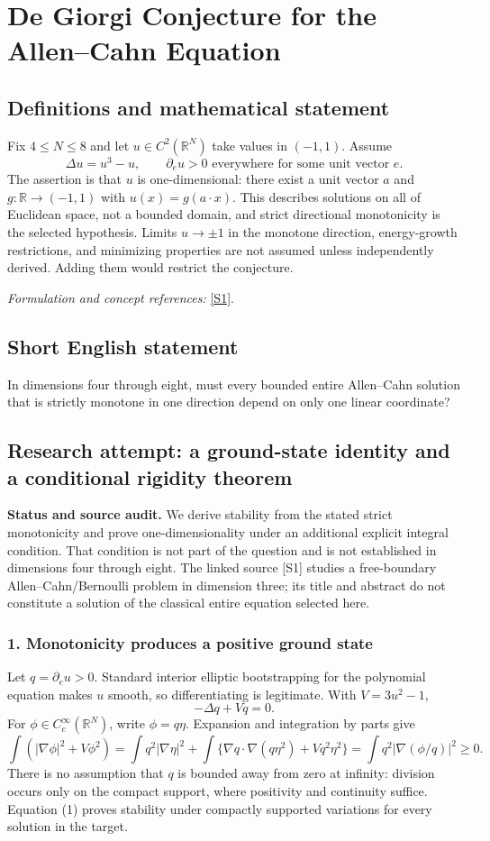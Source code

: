 \documentclass[11pt]{article}
\begin{document}
\section*{\texorpdfstring{De Giorgi Conjecture for the Allen–Cahn Equation}{De Giorgi Conjecture for the Allen–Cahn Equation}}\label{statement}
\subsection{Definitions and mathematical statement}
Fix $4\le N\le8$ and let $u\in C^2({\mathbb{R}}^N)$ take values in $(-1,1)$. Assume
\[
 \Delta u=u^3-u,\qquad \partial_eu>0\text{ everywhere for some unit vector }e.
\]
The assertion is that $u$ is one-dimensional: there exist a unit vector $a$ and $g:{\mathbb{R}}\to(-1,1)$ with $u(x)=g(a\cdot x)$. This describes solutions on all of Euclidean space, not a bounded domain, and strict directional monotonicity is the selected hypothesis. Limits $u\to\pm1$ in the monotone direction, energy-growth restrictions, and minimizing properties are not assumed unless independently derived. Adding them would restrict the conjecture.
\par\smallskip\textit{Formulation and concept references:} \href{https://arxiv.org/abs/2503.21245}{[S1]}.

\subsection{Short English statement}
In dimensions four through eight, must every bounded entire Allen–Cahn solution that is strictly monotone in one direction depend on only one linear coordinate?
\subsection{Research attempt: a ground-state identity and a conditional rigidity theorem}
\textbf{Status and source audit.} We derive stability from the stated strict monotonicity and prove one-dimensionality under an additional explicit integral condition. That condition is not part of the question and is not established in dimensions four through eight. The linked source [S1] studies a free-boundary Allen--Cahn/Bernoulli problem in dimension three; its title and abstract do not constitute a solution of the classical entire equation selected here.

\subsubsection{1. Monotonicity produces a positive ground state}
Let $q=\partial_eu>0$. Standard interior elliptic bootstrapping for the polynomial equation makes $u$ smooth, so differentiating is legitimate. With $V=3u^2-1$,
\[-\Delta q+Vq=0.\]
For $\phi\in C_c^\infty(\mathbb R^N)$, write $\phi=q\eta$. Expansion and integration by parts give
\[\int (|\nabla\phi|^2+V\phi^2)
=\int q^2|\nabla\eta|^2+\int\{\nabla q\cdot\nabla(q\eta^2)+Vq^2\eta^2\}
=\int q^2|\nabla(\phi/q)|^2\ge0.\tag{1}\]
There is no assumption that $q$ is bounded away from zero at infinity: division occurs only on the compact support, where positivity and continuity suffice. Equation (1) proves stability under compactly supported variations for every solution in the target.
\end{document}
